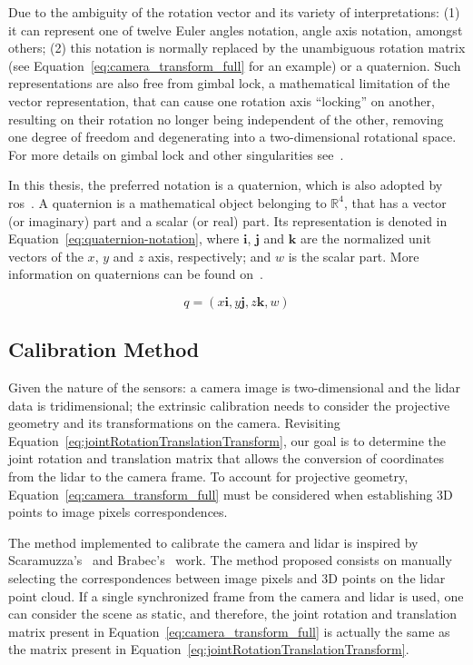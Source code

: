 Due to the ambiguity of the rotation vector and its variety of interpretations: (1) it can represent one of twelve Euler angles notation, angle axis notation, amongst others; (2) this notation is normally replaced by the unambiguous rotation matrix (see Equation~\eqref{eq:camera_transform_full} for an example) or a quaternion. Such representations are also free from gimbal lock, a mathematical limitation of the vector representation, that can cause one rotation axis ``locking'' on another, resulting on their rotation no longer being independent of the other, removing one degree of freedom and degenerating into a two-dimensional rotational space. For more details on gimbal lock and other singularities see~\cite{mvg_book, Slabaugh, camera_models}.

In this thesis, the preferred notation is a quaternion, which is also adopted by \ac{ros}~\cite{Foote2014}. A quaternion is a mathematical object belonging to $\mathbb{R}^4$, that has a vector (or imaginary) part and a scalar (or real) part. Its representation is denoted in Equation~\eqref{eq:quaternion-notation}, where $\mathbf{i}$, $\mathbf{j}$ and $\mathbf{k}$ are the normalized unit vectors of the $x$, $y$ and $z$ axis, respectively; and $w$ is the scalar part. More information on quaternions can be found on~\cite{mvg_book}.

\begin{equation}
	\label{eq:quaternion-notation}
	q = (x\mathbf{i}, y\mathbf{j}, z\mathbf{k}, w)
\end{equation}

\subsection{Calibration Method}
\label{subsec:calibration:calibration-method}
Given the nature of the sensors: a camera image is two-dimensional and the \ac{lidar} data is tridimensional; the extrinsic calibration needs to consider the projective geometry and its transformations on the camera. Revisiting Equation~\eqref{eq:jointRotationTranslationTransform}, our goal is to determine the joint rotation and translation matrix that allows the conversion of coordinates from the \ac{lidar} to the camera frame. To account for projective geometry, Equation~\eqref{eq:camera_transform_full} must be considered when establishing 3D points to image pixels correspondences.

The method implemented to calibrate the camera and \ac{lidar} is inspired by Scaramuzza's\etal~\cite{Scaramuzza} and Brabec's~\cite{brabec2014} work. The method proposed consists on manually selecting the correspondences between image pixels and 3D points on the \ac{lidar} point cloud. If a single synchronized frame from the camera and \ac{lidar} is used, one can consider the scene as static, and therefore, the joint rotation and translation matrix present in Equation~\eqref{eq:camera_transform_full} is actually the same as the matrix present in Equation~\eqref{eq:jointRotationTranslationTransform}. 

